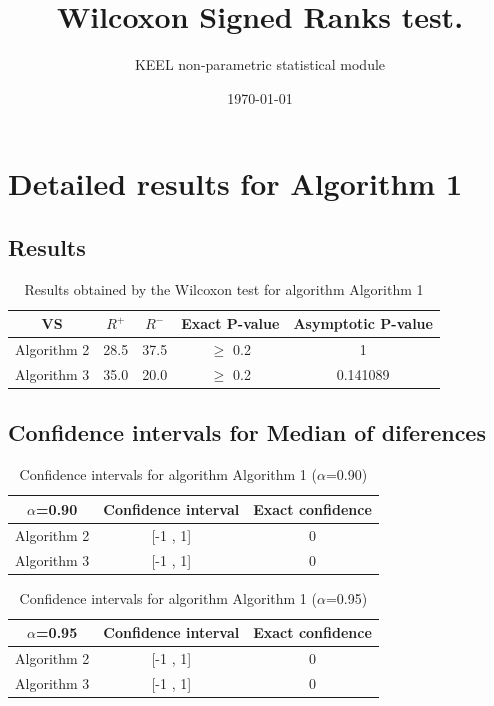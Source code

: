 \documentclass[a4paper,10pt]{article}
\title{Wilcoxon Signed Ranks test.}
\date{\today}
\author{KEEL non-parametric statistical module}
\begin{document}
\pagestyle{empty}
\maketitle
\thispagestyle{empty}



\section{Detailed results for Algorithm 1}


\subsection{Results}

\begin{table}[!htp]
\centering\small
\begin{tabular}{
|c|c|c|c|c|}
\hline
 VS & $R^{+}$ & $R^{-}$ & Exact P-value & Asymptotic P-value \\ \hline 
Algorithm 2 & 28.5 & 37.5 & $\geq$ 0.2 & 1\\ \hline 
Algorithm 3 & 35.0 & 20.0 & $\geq$ 0.2 & 0.141089\\ \hline 

\end{tabular}
\caption{Results obtained by the Wilcoxon test for algorithm Algorithm 1}
\end{table}

\subsection{Confidence intervals for Median of diferences}

\begin{table}[!htp]
\centering\small
\begin{tabular}{
|c|c|c|}
\hline
 $\alpha$=0.90 & Confidence interval & Exact confidence \\ \hline 
Algorithm 2 & [-1 , 1] & 0\\ \hline 
Algorithm 3 & [-1 , 1] & 0\\ \hline 

\end{tabular}
\caption{Confidence intervals for algorithm Algorithm 1 ($\alpha$=0.90)}
\end{table}
\begin{table}[!htp]
\centering\small
\begin{tabular}{
|c|c|c|}
\hline
 $\alpha$=0.95 & Confidence interval & Exact confidence \\ \hline 
Algorithm 2 & [-1 , 1] & 0\\ \hline 
Algorithm 3 & [-1 , 1] & 0\\ \hline 

\end{tabular}
\caption{Confidence intervals for algorithm Algorithm 1 ($\alpha$=0.95)}
\end{table}
\end{document}
